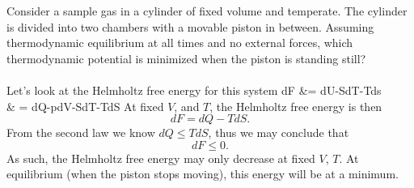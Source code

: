 \documentclass[11pt,letterpaper]{article}
\begin{document}
	Consider a sample gas in a cylinder of fixed volume and temperate. The cylinder is divided into two chambers with a movable piston
	in between. Assuming thermodynamic equilibrium at all times and no external forces, which thermodynamic potential is minimized 	
	when the piston is standing still? 
	\\
	\\
	Let's look at the Helmholtz free energy for this system
	\ba
		dF &= dU-SdT-Tds 
		\\
		& = dQ-pdV-SdT-TdS
	\ea
	At fixed $V$, and $T$, the Helmholtz free energy is then
	\[
		dF = dQ-TdS.
	\]
	From the second law we know $dQ\le TdS$, thus we may conclude that
	\[
		dF \le 0.
	\]
	As such, the Helmholtz free energy may only decrease at fixed $V$, $T$. At equilibrium (when the piston stops moving), this energy 
	will be at a minimum. 
	 
\eenum
\end{document}
